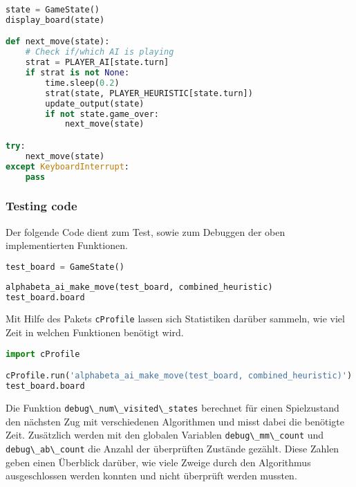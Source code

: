 \begin{lstlisting}[language=Python]
state = GameState()
display_board(state)

def next_move(state):
    # Check if/which AI is playing
    strat = PLAYER_AI[state.turn]
    if strat is not None:
        time.sleep(0.2)
        strat(state, PLAYER_HEURISTIC[state.turn])
        update_output(state)
        if not state.game_over:
            next_move(state)

try:
    next_move(state)
except KeyboardInterrupt:
    pass
\end{lstlisting}

\hypertarget{testing-code}{%
\subsubsection{Testing code}\label{testing-code}}

Der folgende Code dient zum Test, sowie zum Debuggen der oben
implementierten Funktionen.

\begin{lstlisting}[language=Python]
test_board = GameState()
\end{lstlisting}

\begin{lstlisting}[language=Python]
alphabeta_ai_make_move(test_board, combined_heuristic)
test_board.board
\end{lstlisting}

Mit Hilfe des Pakets \passthrough{\lstinline!cProfile!} lassen sich
Statistiken darüber sammeln, wie viel Zeit in welchen Funktionen
benötigt wird.

\begin{lstlisting}[language=Python]
import cProfile

cProfile.run('alphabeta_ai_make_move(test_board, combined_heuristic)')
test_board.board
\end{lstlisting}

Die Funktion \passthrough{\lstinline!debug\_num\_visited\_states!}
berechnet für einen Spielzustand den nächsten Zug mit verschiedenen
Algorithmen und misst dabei die benötigte Zeit. Zusätzlich werden mit
den globalen Variablen \passthrough{\lstinline!debug\_mm\_count!} und
\passthrough{\lstinline!debug\_ab\_count!} die Anzahl der überprüften
Zustände gezählt. Diese Zahlen geben einen Überblick darüber, wie viele
Zweige durch den Algorithmus ausgeschlossen werden konnten und nicht
überprüft werden mussten.

